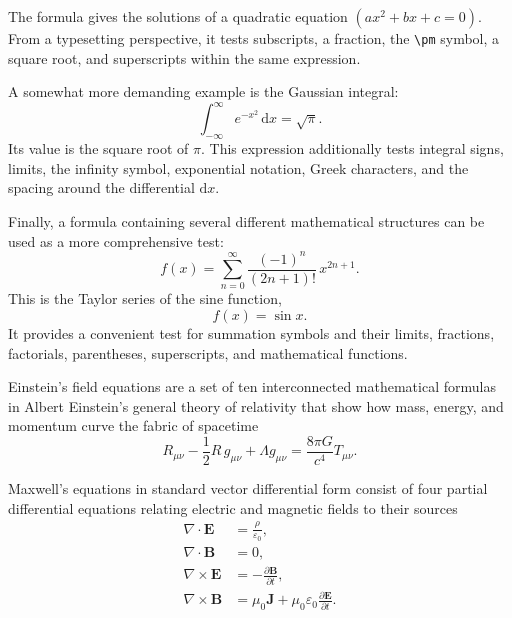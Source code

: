 \documentclass[
11pt,
a4paper,
oneside
]{scrbook}
\begin{document}
The formula gives the solutions of a quadratic equation $(ax^2+bx+c=0)$. From a typesetting perspective, it tests subscripts, a fraction, the \verb|\pm| symbol, a square root, and superscripts within the same expression.

A somewhat more demanding example is the Gaussian integral:
\begin{equation}
	\int_{-\infty}^{\infty} e^{-x^2}\,\mathrm{d}x
	=
	\sqrt{\pi}.
	\label{eq:gaussian-integral}
\end{equation}
Its value is the square root of $\pi$. This expression additionally tests integral signs, limits, the infinity symbol, exponential notation, Greek characters, and the spacing around the differential $\mathrm{d}x$.

Finally, a formula containing several different mathematical structures can be used as a more comprehensive test:
\begin{equation}
	f(x)
	=
	\sum_{n=0}^{\infty}
	\frac{(-1)^n}{(2n+1)!}\,
	x^{2n+1}.
	\label{eq:sine-series}
\end{equation}
This is the Taylor series of the sine function,
\begin{equation}
	f(x)=\sin x.
	\label{eq:sine-function}
\end{equation}
It provides a convenient test for summation symbols and their limits, fractions, factorials, parentheses, superscripts, and mathematical functions.

Einstein's field equations are a set of ten interconnected mathematical formulas in Albert Einstein's general theory of relativity that show how mass, energy, and momentum curve the fabric of spacetime
\begin{equation}
	R_{\mu\nu}
	-\frac{1}{2}R\,g_{\mu\nu}
	+\Lambda g_{\mu\nu}
	=
	\frac{8\pi G}{c^4}T_{\mu\nu} .
	\label{eq:einstein-field-equations}
\end{equation}

Maxwell's equations in standard vector differential form consist of four partial differential equations relating electric and magnetic fields to their sources
\begin{align}
	\nabla \cdot \mathbf{E}
	&= \frac{\rho}{\varepsilon_0},
	\label{eq:maxwell-diff-gauss-electric}
	\\
	\nabla \cdot \mathbf{B}
	&= 0,
	\label{eq:maxwell-diff-gauss-magnetic}
	\\
	\nabla \times \mathbf{E}
	&= -\frac{\partial \mathbf{B}}{\partial t},
	\label{eq:maxwell-diff-faraday}
	\\
	\nabla \times \mathbf{B}
	&= \mu_0 \mathbf{J}
	+ \mu_0\varepsilon_0
	\frac{\partial \mathbf{E}}{\partial t}.
	\label{eq:maxwell-diff-ampere}
\end{align}
\end{document}
